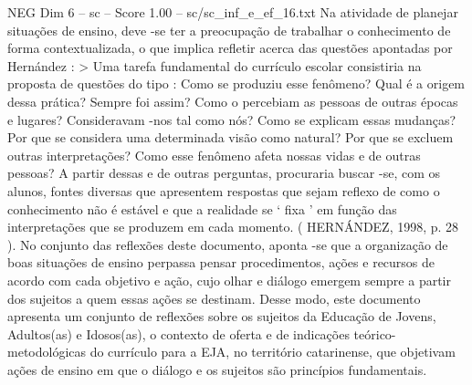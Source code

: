 \begin{textsample}{NEG Dim 6 – sc – Score 1.00 – sc/sc\_inf\_e\_ef\_16.txt}
Na atividade de planejar situações de ensino, deve -se ter a preocupação de trabalhar o conhecimento de forma contextualizada, o que implica refletir acerca das questões apontadas por Hernández : > Uma tarefa fundamental do currículo escolar consistiria na proposta de questões do tipo : Como se produziu esse fenômeno?
Qual é a origem dessa prática?
Sempre foi assim?
Como o percebiam as pessoas de outras épocas e lugares?
Consideravam -nos tal como nós?
Como se explicam essas mudanças?
Por que se considera uma determinada visão como natural?
Por que se excluem outras interpretações?
Como esse fenômeno afeta nossas vidas e de outras pessoas?
A partir dessas e de outras perguntas, procuraria buscar -se, com os alunos, fontes diversas que apresentem respostas que sejam reflexo de como o conhecimento não é estável e que a realidade se ‘ fixa ’ em função das interpretações que se produzem em cada momento. ( HERNÁNDEZ, 1998, p. 28 ).
No conjunto das reflexões deste documento, aponta -se que a organização de boas situações de ensino perpassa pensar procedimentos, ações e recursos de acordo com cada objetivo e ação, cujo olhar e diálogo emergem sempre a partir dos sujeitos a quem essas ações se destinam.
Desse modo, este documento apresenta um conjunto de reflexões sobre os sujeitos da Educação de Jovens, Adultos(as) e Idosos(as), o contexto de oferta e de indicações teórico-metodológicas do currículo para a EJA, no território catarinense, que objetivam ações de ensino em que o diálogo e os sujeitos são princípios fundamentais.

\end{textsample}
